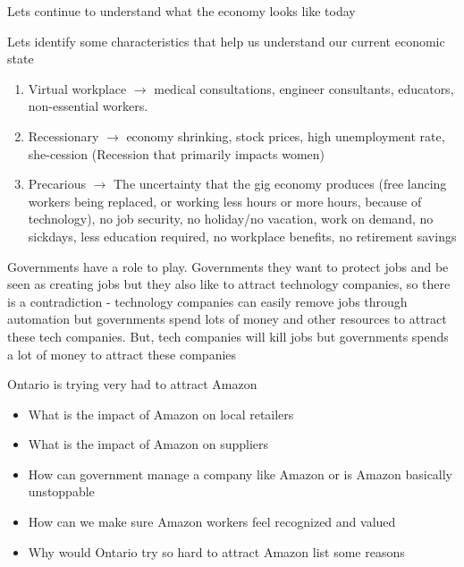 \documentclass[11pt]{article}
\begin{document}
Lets continue to understand what the economy looks like today

Lets identify some characteristics that help us understand our current economic state

\begin{enumerate}
    \item Virtual workplace $\rightarrow$ medical consultations, engineer consultants, educators, non-essential workers.
    \item Recessionary $\rightarrow$ economy shrinking, stock prices, high unemployment rate, she-cession (Recession that primarily impacts women)
    \item Precarious $\rightarrow$ The uncertainty that the gig economy produces (free lancing workers being replaced, or working less hours or more hours, because of technology), no job security, no holiday/no vacation, work on demand, no sickdays, less education required, no workplace benefits, no retirement savings
\end{enumerate}

Governments have a role to play. Governments they want to protect jobs and be seen as creating jobs but they also like to attract technology companies, so there is a contradiction - technology companies can easily remove jobs through automation but governments spend lots of money and other resources to attract these tech companies. But, tech companies will kill jobs but governments spends a lot of money to attract these companies

Ontario is trying very had to attract Amazon 

\begin{itemize}
    \item What is the impact of Amazon on local retailers
    \item What is the impact of Amazon on suppliers
    \item How can government manage a company like Amazon or is Amazon basically unstoppable
    \item How can we make sure Amazon workers feel recognized and valued
    \item Why would Ontario try so hard to attract Amazon list some reasons
\end{itemize}
\end{document}
